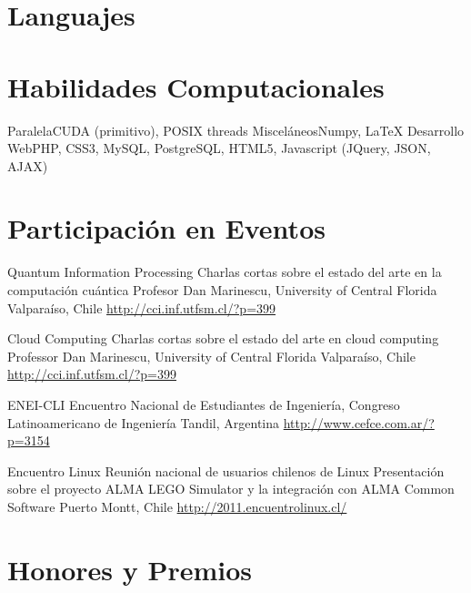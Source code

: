 \documentclass[11pt,a4paper]{moderncv}
\begin{document}
\section{Languajes}

\section{Habilidades Computacionales}
           {Paralela}{CUDA (primitivo), POSIX threads}
           {Misceláneos}{Numpy, \LaTeX}
           {Desarrollo Web}{PHP, CSS3, MySQL, PostgreSQL, HTML5, Javascript (JQuery, JSON, AJAX)}

\section{Participación en Eventos}

        {Quantum Information Processing}
        {Charlas cortas sobre el estado del arte en la computación cuántica}
        {Profesor Dan Marinescu, University of Central Florida}
        {Valparaíso, Chile}
        {\url{http://cci.inf.utfsm.cl/?p=399}}

        {Cloud Computing}
        {Charlas cortas sobre el estado del arte en cloud computing}
        {Professor Dan Marinescu, University of Central Florida}
        {Valparaíso, Chile}
        {\url{http://cci.inf.utfsm.cl/?p=399}}

        {ENEI-CLI}
        {Encuentro Nacional de Estudiantes de Ingeniería, Congreso Latinoamericano de Ingeniería}{}
        {Tandil, Argentina}
        {\url{http://www.cefce.com.ar/?p=3154}}

        {Encuentro Linux}
        {Reunión nacional de usuarios chilenos de Linux}
        {Presentación sobre el proyecto ALMA LEGO Simulator y la integración con ALMA Common Software}
        {Puerto Montt, Chile}
        {\url{http://2011.encuentrolinux.cl/}}

\section{Honores y Premios}

\end{document}
